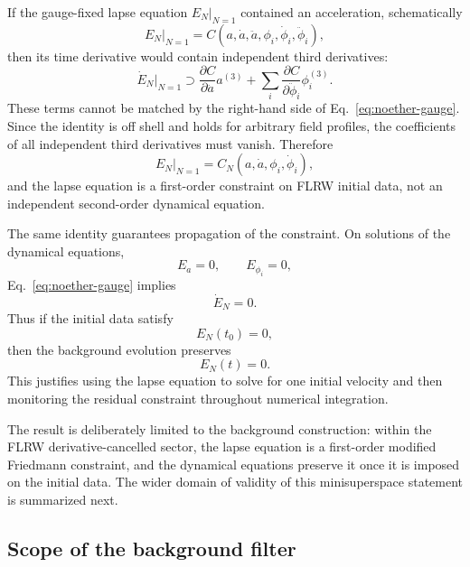 \documentclass[aps,prd,twocolumn,superscriptaddress,nofootinbib,longbibliography]{revtex4-2}
\begin{document}
If the gauge-fixed lapse equation $E_N|_{N=1}$ contained an acceleration, schematically
\begin{equation}
E_N|_{N=1}=C(a,\dot a,\ddot a,\phi_i,\dot\phi_i,\ddot\phi_i),
\end{equation}
then its time derivative would contain independent third derivatives:
\begin{equation}
\dot E_N|_{N=1}
\supset
\frac{\partial C}{\partial \ddot a}a^{(3)}
+\sum_i
\frac{\partial C}{\partial \ddot\phi_i}\phi_i^{(3)}.
\end{equation}
These terms cannot be matched by the right-hand side of Eq.~\eqref{eq:noether-gauge}.  Since the identity is off shell and holds for arbitrary field profiles, the coefficients of all independent third derivatives must vanish.  Therefore
\begin{equation}
E_N|_{N=1}=C_N(a,\dot a,\phi_i,\dot\phi_i),
\label{eq:first-order-constraint}
\end{equation}
and the lapse equation is a first-order constraint on FLRW initial data, not an independent second-order dynamical equation.


The same identity guarantees propagation of the constraint.  On solutions of the dynamical equations,
\begin{equation}
E_a=0,\qquad E_{\phi_i}=0,
\end{equation}
Eq.~\eqref{eq:noether-gauge} implies
\begin{equation}
\dot E_N=0.
\end{equation}
Thus if the initial data satisfy
\begin{equation}
E_N(t_0)=0,
\end{equation}
then the background evolution preserves
\begin{equation}
E_N(t)=0.
\end{equation}
This justifies using the lapse equation to solve for one initial velocity and then monitoring the residual constraint throughout numerical integration.

The result is deliberately limited to the background construction: within the FLRW derivative-cancelled sector, the lapse equation is a first-order modified Friedmann constraint, and the dynamical equations preserve it once it is imposed on the initial data.  The wider domain of validity of this minisuperspace statement is summarized next.

\subsection{Scope of the background filter}
\label{subsec:ghost-scope}
\end{document}
